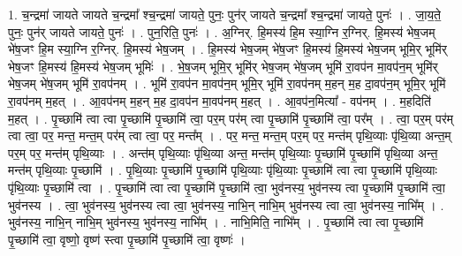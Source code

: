 \documentclass[17pt]{extarticle}
\begin{document}
1. च॒न्द्रमा॑ जायते जायते च॒न्द्रमा᳚ श्च॒न्द्रमा॑ जायते॒ पुनः॒ पुन॑र् जायते च॒न्द्रमा᳚ श्च॒न्द्रमा॑ जायते॒ पुनः॑ । . जा॒य॒ते॒ पुनः॒ पुन॑र् जायते जायते॒ पुनः॑ । . पुन॒रिति॒ पुनः॑ । . अ॒ग्निर्. हि॒मस्य॑ हि॒म स्या॒ग्नि र॒ग्निर्. हि॒मस्य॑ भेष॒जम् भे॑ष॒जꣳ हि॒म स्या॒ग्नि र॒ग्निर्. हि॒मस्य॑ भेष॒जम् । . हि॒मस्य॑ भेष॒जम् भे॑ष॒जꣳ हि॒मस्य॑ हि॒मस्य॑ भेष॒जम् भूमि॒र् भूमि॑र् भेष॒जꣳ हि॒मस्य॑ हि॒मस्य॑ भेष॒जम् भूमिः॑ । . भे॒ष॒जम् भूमि॒र् भूमि॑र् भेष॒जम् भे॑ष॒जम् भूमि॑ रा॒वप॑न मा॒वप॑न॒म् भूमि॑र् भेष॒जम् भे॑ष॒जम् भूमि॑ रा॒वप॑नम् । . भूमि॑ रा॒वप॑न मा॒वप॑न॒म् भूमि॒र् भूमि॑ रा॒वप॑नम् म॒हन् म॒ह दा॒वप॑न॒म् भूमि॒र् भूमि॑ रा॒वप॑नम् म॒हत् । . आ॒वप॑नम् म॒हन् म॒ह दा॒वप॑न मा॒वप॑नम् म॒हत् । . आ॒वप॑न॒मित्या᳚ - वप॑नम् । . म॒हदिति॑ म॒हत् । . पृ॒च्छामि॑ त्वा त्वा पृ॒च्छामि॑ पृ॒च्छामि॑ त्वा॒ पर॒म् पर॑म् त्वा पृ॒च्छामि॑ पृ॒च्छामि॑ त्वा॒ पर᳚म् । . त्वा॒ पर॒म् पर॑म् त्वा त्वा॒ पर॒ मन्त॒ मन्त॒म् पर॑म् त्वा त्वा॒ पर॒ मन्त᳚म् । . पर॒ मन्त॒ मन्त॒म् पर॒म् पर॒ मन्त॑म् पृथि॒व्याः पृ॑थि॒व्या अन्त॒म् पर॒म् पर॒ मन्त॑म् पृथि॒व्याः । . अन्त॑म् पृथि॒व्याः पृ॑थि॒व्या अन्त॒ मन्त॑म् पृथि॒व्याः पृ॒च्छामि॑ पृ॒च्छामि॑ पृथि॒व्या अन्त॒ मन्त॑म् पृथि॒व्याः पृ॒च्छामि॑ । . पृ॒थि॒व्याः पृ॒च्छामि॑ पृ॒च्छामि॑ पृथि॒व्याः पृ॑थि॒व्याः पृ॒च्छामि॑ त्वा त्वा पृ॒च्छामि॑ पृथि॒व्याः पृ॑थि॒व्याः पृ॒च्छामि॑ त्वा । . पृ॒च्छामि॑ त्वा त्वा पृ॒च्छामि॑ पृ॒च्छामि॑ त्वा॒ भुव॑नस्य॒ भुव॑नस्य त्वा पृ॒च्छामि॑ पृ॒च्छामि॑ त्वा॒ भुव॑नस्य । . त्वा॒ भुव॑नस्य॒ भुव॑नस्य त्वा त्वा॒ भुव॑नस्य॒ नाभि॒न् नाभि॒म् भुव॑नस्य त्वा त्वा॒ भुव॑नस्य॒ नाभि᳚म् । . भुव॑नस्य॒ नाभि॒न् नाभि॒म् भुव॑नस्य॒ भुव॑नस्य॒ नाभि᳚म् । . नाभि॒मिति॒ नाभि᳚म् । . पृ॒च्छामि॑ त्वा त्वा पृ॒च्छामि॑ पृ॒च्छामि॑ त्वा॒ वृष्णो॒ वृष्ण॑ स्त्वा पृ॒च्छामि॑ पृ॒च्छामि॑ त्वा॒ वृष्णः॑ । \newline
\end{document}
